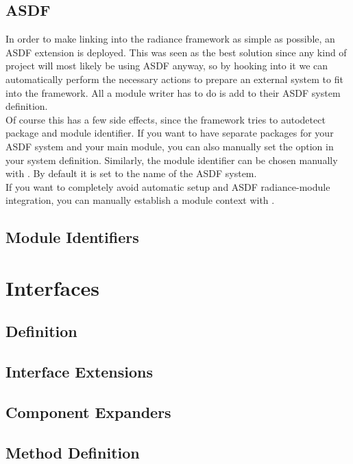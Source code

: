 \subsection{ASDF}\label{sec:mod asdf}
In order to make linking into the radiance framework as simple as possible, an ASDF extension is deployed. This was seen as the best solution since any kind of project will most likely be using ASDF anyway, so by hooking into it we can automatically perform the necessary actions to prepare an external system to fit into the framework. All a module writer has to do is add  to their ASDF system definition. \\

Of course this has a few side effects, since the framework tries to autodetect package and module identifier. If you want to have separate packages for your ASDF system and your main module, you can also manually set the  option in your system definition. Similarly, the module identifier can be chosen manually with . By default it is set to the name of the ASDF system. \\

If you want to completely avoid automatic setup and ASDF radiance-module integration, you can manually establish a module context with .
\subsection{Module Identifiers}\label{sec:mod module identifiers}
\newpage
\section{Interfaces}\label{sec:int interfaces}
\subsection{Definition}\label{sec:int definition}
\subsection{Interface Extensions}\label{sec:int interface extensions}
\subsection{Component Expanders}\label{sec:int component expanders}
\subsection{Method Definition}\label{sec:int method definition}
